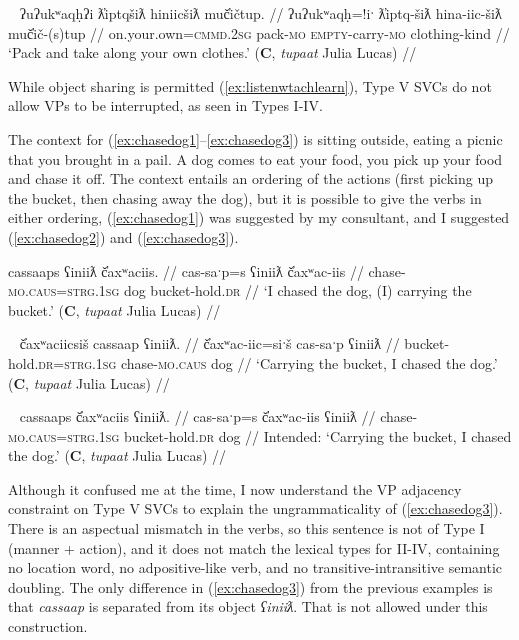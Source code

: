 \ex~ \label{ex:packandtake}
\begingl
\glpreamble ʔuʔukʷaqḥʔi ƛ̓iptqšiƛ hiniicšiƛ muč̓ičtup. //
\gla ʔuʔukʷaqḥ=!iˑ ƛ̓iptq-šiƛ hina-iic-šiƛ muč̓ič-(s)tup //
\glb on.your.own=\textsc{cmmd.2sg} pack-\textsc{mo} \textsc{empty}-carry-\textsc{mo} clothing-kind //
\glft `Pack and take along your own clothes.' (\textbf{C}, \textit{tupaat} Julia Lucas) //
\endgl
\xe

While object sharing is permitted (\ref{ex:listenwtachlearn}), Type V SVCs do not allow VPs to be interrupted, as seen in Types I-IV.

The context for (\ref{ex:chasedog1}--\ref{ex:chasedog3}) is sitting outside, eating a picnic that you brought in a pail. A dog comes to eat your food, you pick up your food and chase it off. The context entails an ordering of the actions (first picking up the bucket, then chasing away the dog), but it is possible to give the verbs in either ordering, (\ref{ex:chasedog1}) was suggested by my consultant, and I suggested (\ref{ex:chasedog2}) and (\ref{ex:chasedog3}). 

\ex \label{ex:chasedog1}
\begingl
\glpreamble cassaaps ʕiniiƛ č̓axʷaciis. //
\gla cas-saˑp=s ʕiniiƛ č̓axʷac-iis //
\glb chase-\textsc{mo.caus}=\textsc{strg.1sg} dog bucket-hold.\textsc{dr} //
\glft `I chased the dog, (I) carrying the bucket.' (\textbf{C}, \textit{tupaat} Julia Lucas) //
\endgl
\xe

\ex~ \label{ex:chasedog2}
\begingl
\glpreamble č̓axʷaciicsiš cassaap ʕiniiƛ. //
\gla č̓axʷac-iic=siˑš cas-saˑp ʕiniiƛ //
\glb bucket-hold.\textsc{dr}=\textsc{strg.1sg} chase-\textsc{mo.caus} dog //
\glft `Carrying the bucket, I chased the dog.' (\textbf{C}, \textit{tupaat} Julia Lucas) //
\endgl
\xe

\ex~ \label{ex:chasedog3}
\begingl
\glpreamble *cassaaps č̓axʷaciis ʕiniiƛ. //
\gla cas-saˑp=s č̓axʷac-iis ʕiniiƛ //
\glb chase-\textsc{mo.caus}=\textsc{strg.1sg} bucket-hold.\textsc{dr} dog //
\glft Intended: `Carrying the bucket, I chased the dog.' (\textbf{C}, \textit{tupaat} Julia Lucas) //
\endgl
\xe

Although it confused me at the time, I now understand the VP adjacency constraint on Type V SVCs to explain the ungrammaticality of (\ref{ex:chasedog3}). There is an aspectual mismatch in the verbs, so this sentence is not of Type I (manner + action), and it does not match the lexical types for II-IV, containing no location word, no adpositive-like verb, and no transitive-intransitive semantic doubling. The only difference in (\ref{ex:chasedog3}) from the previous examples is that \textit{cassaap} is separated from its object \textit{ʕiniiƛ}. That is not allowed under this construction.

